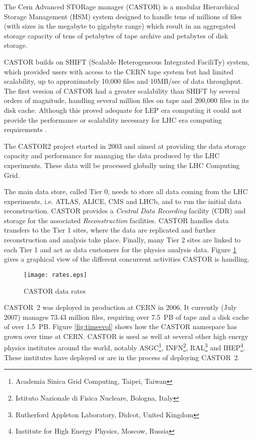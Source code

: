 The Cern Advanced STORage manager (CASTOR) is a modular Hierarchical
Storage Management (HSM) system designed to handle tens of millions of
files (with sizes in the megabyte to gigabyte range) which result in
an aggregated storage capacity of tens of petabytes of tape archive
and petabytes of disk storage.

CASTOR builds on SHIFT (Scalable Heterogeneous
Integrated FaciliTy) system, which provided users with access
to the CERN tape system but had limited scalability, up to
approximately 10,000 files and 10MB/sec of data throughput. The
first version of CASTOR had a greater scalability than SHIFT by
several orders of magnitude, handling several million files on tape
and 200,000 files in its disk cache. Although this proved adequate
for LEP era computing it could not provide the performance or
scalability necessary for LHC era computing requirements \cite{castor}.

The CASTOR2 project started in 2003 and aimed at providing 
the data storage capacity and performance for managing the data
produced by the LHC experiments. These data
will be processed globally using the LHC Computing Grid\cite{LCG}.

The main data store, called Tier 0, needs to store all data coming from
the LHC experiments, i.e. ATLAS, ALICE, CMS and LHCb, and to run the
initial data reconstruction. CASTOR provides a \textit{Central Data 
Recording} facility (CDR) and storage for the 
associated \textit{Reconstruction} facilities. CASTOR handles
data transfers to the Tier 1 sites, where the data are replicated and
further reconstruction and analysis take place.
Finally, many Tier 2 sites are linked to each Tier 1 and act as data customers
for the physics analysis data. Figure \ref{fig:rates} gives a
graphical view of the different concurrent activities
CASTOR is handling.

\begin{figure}[htbp]
\centering
\texttt{[image: rates.eps]}
\caption{CASTOR data rates}
\label{fig:rates}
\end{figure}


CASTOR~2 was deployed in production at CERN in 2006. It
currently (July 2007) manages 73.43 million files, requiring
over 7.5~PB of tape and a disk cache of over 1.5~PB.
Figure \ref{fig:timeevol} shows how the CASTOR namespace has grown over time at
CERN. CASTOR is used as well at several other high
energy physics institutes around the world, notably
ASGC\footnote{Academia Sinica Grid Computing,
Taipei, Taiwan
}, INFN\footnote{Istituto Nazionale di Fisica Nucleare,
Bologna, Italy
}, RAL\footnote{Rutherford Appleton Laboratory,
Didcot, United Kingdom
} and IHEP\footnote{Institute for High Energy Physics,
Moscow, Russia
}.
These institutes have deployed
or are in the process of deploying CASTOR~2.

